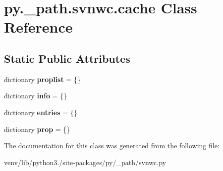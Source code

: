 \hypertarget{classpy_1_1__path_1_1svnwc_1_1cache}{}\section{py.\+\_\+path.\+svnwc.\+cache Class Reference}
\label{classpy_1_1__path_1_1svnwc_1_1cache}
\subsection*{Static Public Attributes}
\begin{DoxyCompactItemize}
\item 
\mbox{\label{classpy_1_1__path_1_1svnwc_1_1cache_aa0cfaf7837b299ef8b4ea3fabda695fa}} 
dictionary {\bfseries proplist} = \{\}
\item 
\mbox{\label{classpy_1_1__path_1_1svnwc_1_1cache_a8de4b39cad6f4af73b7112e8cf1a79f9}} 
dictionary {\bfseries info} = \{\}
\item 
\mbox{\label{classpy_1_1__path_1_1svnwc_1_1cache_ac38d7762b988ea1e02237d1e1acb54b9}} 
dictionary {\bfseries entries} = \{\}
\item 
\mbox{\label{classpy_1_1__path_1_1svnwc_1_1cache_a2a9ee6b5162ecf3ec4fa5b73dd31215c}} 
dictionary {\bfseries prop} = \{\}
\end{DoxyCompactItemize}


The documentation for this class was generated from the following file\+:\begin{DoxyCompactItemize}
\item 
venv/lib/python3./site-\/packages/py/\+\_\+path/svnwc.\+py\end{DoxyCompactItemize}
